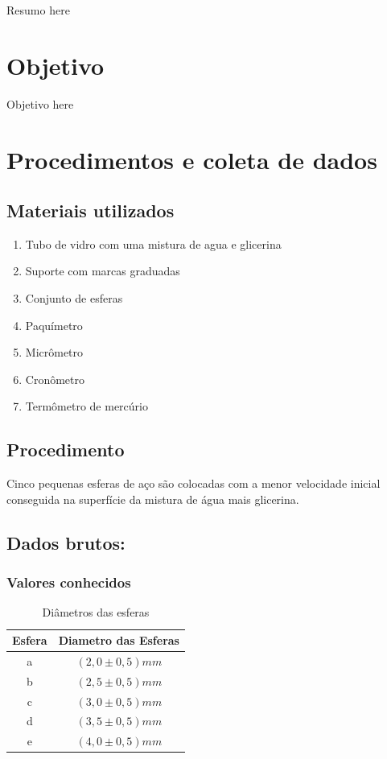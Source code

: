 \documentclass[english,brazil]{article}
\providecommand{\tabularnewline}{\\}
\begin{document}
		Resumo here


	\section{Objetivo}

		Objetivo here


	\section{Procedimentos e coleta de dados}


		\subsection{Materiais utilizados}
			\begin{enumerate}
				\item Tubo de vidro com uma mistura de agua e glicerina 
				\item Suporte com marcas graduadas 
				\item Conjunto de esferas 
				\item Paquímetro 
				\item Micrômetro 
				\item Cronômetro 
				\item Termômetro de mercúrio 
			\end{enumerate}

		\subsection{Procedimento}

			Cinco pequenas esferas de aço são colocadas com a menor velocidade
			inicial conseguida na superfície da mistura de água mais glicerina.


		\subsection{Dados brutos:}


			\subsubsection{Valores conhecidos}

				\begin{table}[H]
					\caption{Diâmetros das esferas}


					\centering{}%
					\begin{tabular}{|c|c|}
						\hline 
						Esfera  & Diametro das Esferas \tabularnewline
						\hline 
						a  & $(2,0\pm0,5)\unit{mm}$\tabularnewline
						\hline 
						b  & $(2,5\pm0,5)\unit{mm}$\tabularnewline
						\hline 
						c  & $(3,0\pm0,5)\unit{mm}$\tabularnewline
						\hline 
						d  & $(3,5\pm0,5)\unit{mm}$\tabularnewline
						\hline 
						e  & $(4,0\pm0,5)\unit{mm}$\tabularnewline
						\hline 
					\end{tabular}
				\end{table}
\end{document}
